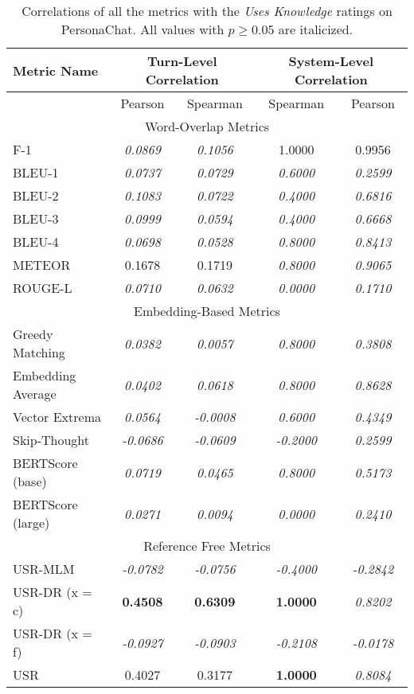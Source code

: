 \documentclass[11pt,a4paper]{article}
\begin{document}
\begin{table*}
    \centering
    \renewcommand*{\arraystretch}{1.2}
    \begin{tabular}{|l|c|c|c|c|}
    \hline
        \textbf{Metric Name} & \multicolumn{2}{|c|}{\textbf{Turn-Level Correlation}} & \multicolumn{2}{|c|}{\textbf{System-Level Correlation}}  \\ \hline
         & Pearson & Spearman & Spearman & Pearson \\ \hline
         \multicolumn{5}{|c|}{Word-Overlap Metrics} \\ \hline
F-1 & \textit{0.0869} & \textit{0.1056} & 1.0000 & 0.9956 \\
BLEU-1 & \textit{0.0737} & \textit{0.0729} & \textit{0.6000} & \textit{0.2599} \\
BLEU-2 & \textit{0.1083} & \textit{0.0722} & \textit{0.4000} & \textit{0.6816} \\
BLEU-3 & \textit{0.0999} & \textit{0.0594} & \textit{0.4000} & \textit{0.6668} \\
BLEU-4 & \textit{0.0698} & \textit{0.0528} & \textit{0.8000} & \textit{0.8413} \\
METEOR & 0.1678 & 0.1719 & \textit{0.8000} & \textit{0.9065} \\
ROUGE-L & \textit{0.0710} & \textit{0.0632} & \textit{0.0000} & \textit{0.1710} \\\hline 
 \multicolumn{5}{|c|}{Embedding-Based Metrics} \\ \hline
Greedy Matching & \textit{0.0382} & \textit{0.0057} & \textit{0.8000} & \textit{0.3808} \\
Embedding Average & \textit{0.0402} & \textit{0.0618} & \textit{0.8000} & \textit{0.8628} \\
Vector Extrema & \textit{0.0564} & \textit{-0.0008} & \textit{0.6000} & \textit{0.4349} \\
Skip-Thought & \textit{-0.0686} & \textit{-0.0609} & \textit{-0.2000} & \textit{0.2599} \\
BERTScore (base) & \textit{0.0719} & \textit{0.0465} & \textit{0.8000} & \textit{0.5173} \\
BERTScore (large) & \textit{0.0271} & \textit{0.0094} & \textit{0.0000} & \textit{0.2410} \\\hline 
 \multicolumn{5}{|c|}{Reference Free Metrics} \\ \hline
USR-MLM & \textit{-0.0782} & \textit{-0.0756} & \textit{-0.4000} & \textit{-0.2842} \\
USR-DR (x = c) & \textbf{0.4508} & \textbf{0.6309} & \textbf{1.0000} & \textit{0.8202} \\
USR-DR (x = f) & \textit{-0.0927} & \textit{-0.0903} & \textit{-0.2108} & \textit{-0.0178} \\
USR & 0.4027 & 0.3177 & \textbf{1.0000} & \textit{0.8084} \\ \hline
    \end{tabular}
    \caption{Correlations of all the metrics with the \textit{Uses Knowledge} ratings on PersonaChat. All values with $p \geq 0.05$ are italicized.}
    
\end{table*}
\end{document}
